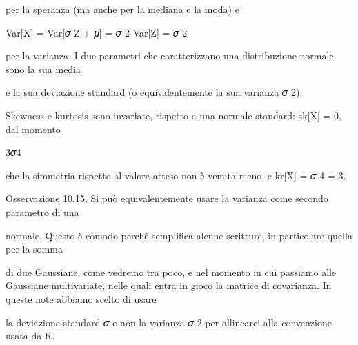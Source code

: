 \documentclass[a4paper,portrait,12pt]{article}
\begin{document}
\begin{flushleft}
per la speranza (ma anche per la mediana e la moda) e
\end{flushleft}


\begin{flushleft}
Var[X] = Var[𝜎 Z + 𝜇] = 𝜎 2 Var[Z] = 𝜎 2
\end{flushleft}


\begin{flushleft}
per la varianza. I due parametri che caratterizzano una distribuzione normale sono la sua media
\end{flushleft}


\begin{flushleft}
e la sua deviazione standard (o equivalentemente la sua varianza 𝜎 2).
\end{flushleft}


\begin{flushleft}
Skewness e kurtosis sono invariate, rispetto a una normale standard: sk[X] = 0, dal momento
\end{flushleft}


\begin{flushleft}
3𝜎4
\end{flushleft}


\begin{flushleft}
che la simmetria rispetto al valore atteso non \`{e} venuta meno, e kr[X] = 𝜎 4 = 3.
\end{flushleft}


\begin{flushleft}
Osservazione 10.15. Si pu\`{o} equivalentemente usare la varianza come secondo parametro di una
\end{flushleft}


\begin{flushleft}
normale. Questo \`{e} comodo perch\'{e} semplifica alcune scritture, in particolare quella per la somma
\end{flushleft}


\begin{flushleft}
di due Gaussiane, come vedremo tra poco, e nel momento in cui passiamo alle Gaussiane multivariate, nelle quali entra in gioco la matrice di covarianza. In queste note abbiamo scelto di usare
\end{flushleft}


\begin{flushleft}
la deviazione standard 𝜎 e non la varianza 𝜎 2 per allinearci alla convenzione usata da R.
\end{flushleft}
\end{document}

